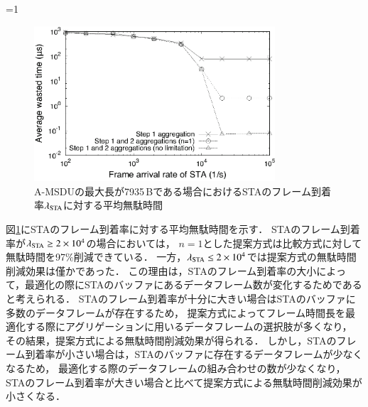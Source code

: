 \documentclass[master]{kuisthesis}		%
\newcounter{flagFig}
\begin{document}
			\par
			\ifnum\value{flagFig}=1 {\begin{figure}[htbp]
				\begin{center}
					\includegraphics[width=0.8\textwidth]{graph/wst_lmd.eps}
					\caption{A-MSDUの最大長が7935\,Bである場合におけるSTAのフレーム到着率$\lambda_{\rm STA}$に対する平均無駄時間}
					\label{fig:wst_lmd}
				\end{center}
			\end{figure}}\fi
			図\ref{fig:wst_lmd}にSTAのフレーム到着率に対する平均無駄時間を示す．
			STAのフレーム到着率が$\lambda_{\rm STA}\geq 2 \times 10^{4}$の場合においては，
			$n=1$とした提案方式は比較方式に対して無駄時間を97\%削減できている．
			一方，$\lambda_{\rm STA}\leq 2 \times 10^{4}$では提案方式の無駄時間削減効果は僅かであった．
			この理由は，STAのフレーム到着率の大小によって，最適化の際にSTAのバッファにあるデータフレーム数が変化するためであると考えられる．
			STAのフレーム到着率が十分に大きい場合はSTAのバッファに多数のデータフレームが存在するため，
			提案方式によってフレーム時間長を最適化する際にアグリゲーションに用いるデータフレームの選択肢が多くなり，
			その結果，提案方式による無駄時間削減効果が得られる．
			しかし，STAのフレーム到着率が小さい場合は，STAのバッファに存在するデータフレームが少なくなるため，
			最適化する際のデータフレームの組み合わせの数が少なくなり，
			STAのフレーム到着率が大きい場合と比べて提案方式による無駄時間削減効果が小さくなる．
\end{document}

